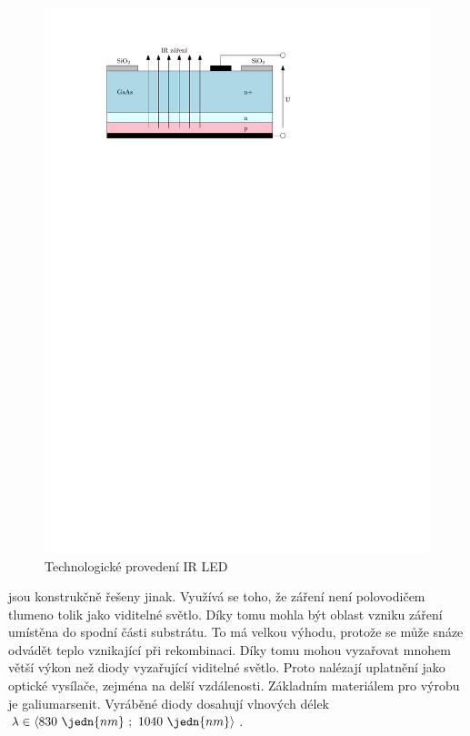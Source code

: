 \begin{figure}[!h]
    \begin{center}
        \includegraphics[scale=1]{img/ir-led}
    \end{center}
    \caption{Technologické provedení IR LED}
\end{figure}

  jsou konstrukčně řešeny jinak. Využívá se toho, že  záření není polovodičem tlumeno tolik jako viditelné světlo. Díky tomu mohla být oblast vzniku záření umístěna do spodní části substrátu. To má velkou výhodu, protože se může snáze odvádět teplo vznikající při rekombinaci. Díky tomu mohou   vyzařovat mnohem větší výkon než diody vyzařující viditelné světlo. Proto nalézají uplatnění jako optické vysílače, zejména na delší vzdálenosti. Základním materiálem pro výrobu   je galiumarsenit. Vyráběné diody dosahují vlnových délek $\lambda \in \langle 830~\jedn{nm}~;~1040~\jedn{nm} \rangle$.


